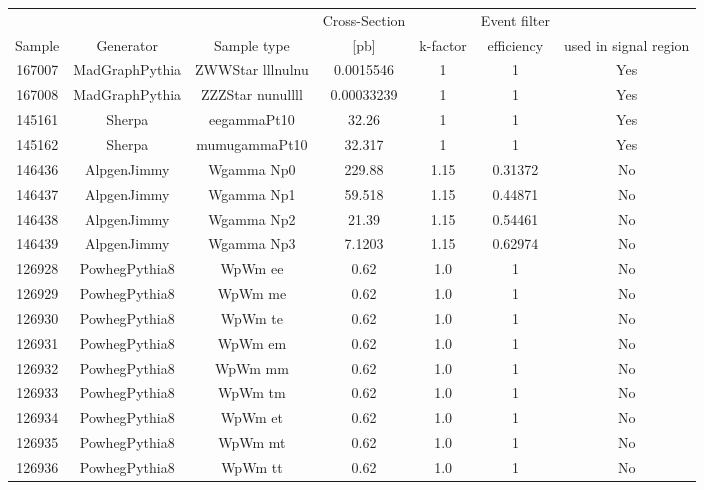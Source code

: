 \begin{table}[ht!]
  \centering
  \begin{footnotesize}
\begin{tabular}{c|c|c|c|c|c|c}
\hline
    &  &  & Cross-Section &  & Event filter  \\
  Sample  & Generator & Sample type & [pb] & k-factor &  efficiency  & used in signal region\\
\hline \hline
167007 & MadGraphPythia & ZWWStar lllnulnu  &  0.0015546  &  1  &  1 & Yes \\
167008 & MadGraphPythia & ZZZStar nunullll  &  0.00033239  &  1  &  1 & Yes \\
145161 & Sherpa & eegammaPt10  &  32.26  &  1  &  1 & Yes \\
145162 & Sherpa & mumugammaPt10  &  32.317  &  1  &  1 & Yes \\
146436 & AlpgenJimmy & Wgamma Np0 & 229.88 & 1.15 & 0.31372 & No \\
146437 & AlpgenJimmy & Wgamma Np1 & 59.518 & 1.15 & 0.44871 & No \\
146438 & AlpgenJimmy & Wgamma Np2 & 21.39  & 1.15 & 0.54461 & No \\
146439 & AlpgenJimmy & Wgamma Np3 & 7.1203 & 1.15 & 0.62974 & No \\
126928 & PowhegPythia8& WpWm ee  &  0.62  &  1.0  &  1 & No  \\
126929 & PowhegPythia8& WpWm me  &  0.62  &  1.0  &  1 & No  \\
126930 & PowhegPythia8& WpWm te  &  0.62  &  1.0  &  1 & No  \\
126931 & PowhegPythia8& WpWm em  &  0.62  &  1.0  &  1 & No \\
126932 & PowhegPythia8& WpWm mm  &  0.62  &  1.0  &  1 & No \\
126933 & PowhegPythia8& WpWm tm  &  0.62  &  1.0  &  1 & No \\
126934 & PowhegPythia8& WpWm et  &  0.62  &  1.0  &  1 & No \\
126935 & PowhegPythia8& WpWm mt  &  0.62  &  1.0  &  1 & No \\
126936 & PowhegPythia8& WpWm tt  &  0.62  &  1.0  &  1 & No \\


\end{tabular}
\end{footnotesize}
\end{table}
